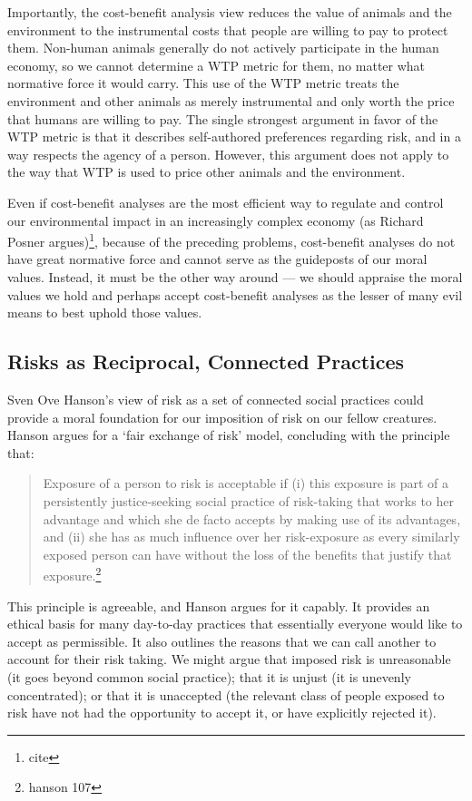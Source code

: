 Importantly, the cost-benefit analysis view reduces the value of animals and
the environment to the instrumental costs that people are willing to pay to
protect them. Non-human animals generally do not actively participate in the
human economy, so we cannot determine a WTP metric for them, no matter what
normative force it would carry. This use of the WTP metric treats the
environment and other animals as merely instrumental and only worth the price
that humans are willing to pay. The single strongest argument in favor of the
WTP metric is that it describes self-authored preferences regarding risk, and
in a way respects the agency of a person. However, this argument does not apply
to the way that WTP is used to price other animals and the environment.

Even if cost-benefit analyses are the most efficient way to regulate and
control our environmental impact in an increasingly complex economy (as Richard
Posner argues)\footnote{cite}, because of the preceding problems, cost-benefit
analyses do not have great normative force and cannot serve as the guideposts
of our moral values.  Instead, it must be the other way around --- we should
appraise the moral values we hold and perhaps accept cost-benefit analyses as
the lesser of many evil means to best uphold those values.

\subsection{Risks as Reciprocal, Connected Practices}

Sven Ove Hanson’s view of risk as a set of connected social practices could
provide a moral foundation for our imposition of risk on our fellow creatures.
Hanson argues for a ‘fair exchange of risk’ model, concluding with the principle
that:

\begin{quote}
  Exposure of a person to risk is acceptable if (i) this exposure is part of a
  persistently justice-seeking social practice of risk-taking that works to her
  advantage and which she de facto accepts by making use of its advantages, and
  (ii) she has as much influence over her risk-exposure as every similarly
  exposed person can have without the loss of the benefits that justify that
  exposure.\footnote{hanson 107}
\end{quote}

This principle is agreeable, and Hanson argues for it capably. It provides an
ethical basis for many day-to-day practices that essentially everyone would
like to accept as permissible.  It also outlines the reasons that  we can call
another to account for their risk taking.  We might argue that imposed risk is
unreasonable (it goes beyond common social practice); that it is unjust (it is
unevenly concentrated); or that it is unaccepted (the relevant class of people
exposed to risk have not had the opportunity to accept it, or have explicitly
rejected it).

